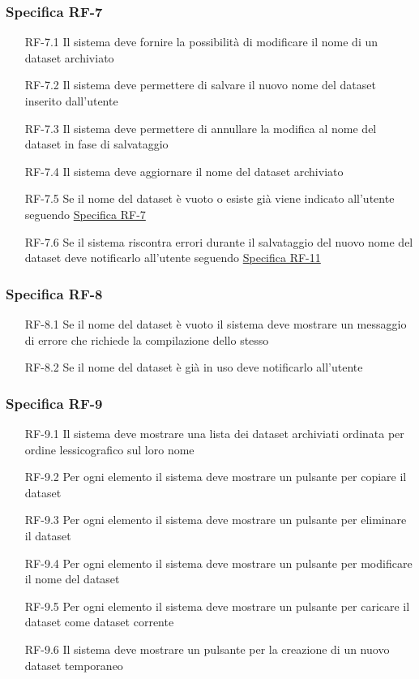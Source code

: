 \subsubsection{Specifica RF-7}
\label{subsubsec:RF-7}
\begin{enumerate}
    \item[RF-7.1] Il sistema deve fornire la possibilità di modificare il nome di un dataset archiviato 
    \item[RF-7.2] Il sistema deve permettere di salvare il nuovo nome del dataset inserito dall'utente
    \item[RF-7.3] Il sistema deve permettere di annullare la modifica al nome del dataset in fase di salvataggio
    \item[RF-7.4] Il sistema deve aggiornare il nome del dataset archiviato
    \item[RF-7.5] Se il nome del dataset è vuoto o esiste già viene indicato all'utente seguendo \hyperref[subsubsec:RF-7]{Specifica RF-7}
    \item[RF-7.6] Se il sistema riscontra errori durante il salvataggio del nuovo nome del dataset deve notificarlo all'utente seguendo \hyperref[subsubsec:RF-11]{Specifica RF-11}
\end{enumerate}

\subsubsection{Specifica RF-8}
\label{subsubsec:RF-8}
\begin{enumerate}
    \item[RF-8.1] Se il nome del dataset è vuoto il sistema deve mostrare un messaggio di errore che richiede la compilazione dello stesso 
    \item[RF-8.2] Se il nome del dataset è già in uso deve notificarlo all'utente
\end{enumerate}

\subsubsection{Specifica RF-9}
\label{subsubsec:RF-9}
\begin{enumerate}
    \item[RF-9.1] Il sistema deve mostrare una lista dei dataset archiviati ordinata per ordine lessicografico sul loro nome
    \item[RF-9.2] Per ogni elemento il sistema deve mostrare un pulsante per copiare il dataset
    \item[RF-9.3] Per ogni elemento il sistema deve mostrare un pulsante per eliminare il dataset
    \item[RF-9.4] Per ogni elemento il sistema deve mostrare un pulsante per modificare il nome del dataset
    \item[RF-9.5] Per ogni elemento il sistema deve mostrare un pulsante per caricare il dataset come dataset corrente 
    \item[RF-9.6] Il sistema deve mostrare un pulsante per la creazione di un nuovo dataset temporaneo
\end{enumerate}

